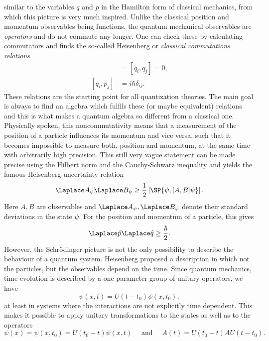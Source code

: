 similar to the variables $q$ and $p$ in the Hamilton form of classical 
mechanics, from which this picture is very much inspired. Unlike the classical 
position and momentum observables being functions, the quantum mechanical 
observables are \emph{operators} and do not commute any longer. One can check 
these by calculating commutators and finds the so-called Heisenberg or 
\emph{classical commutations relations}
\begin{align}
	[p_i, p_j]
	& =
	[q_i, q_j]
	=
	0,
	\\
	[q_i, p_j]
	& =
	i \hbar \delta_{ij}.
\end{align}
These relations are the starting point for all quantization theories. The main 
goal is always to find an algebra which fulfils these (or maybe equivalent) 
relations and this is what makes a quantum algebra so different from a 
classical one. Physically spoken, this noncommutativity means that a 
measurement of the position of a particle influences its momentum and vice 
versa, such that it becomes impossible to measure both, position and momentum, 
at the same time with arbitrarily high precision. This still very vague 
statement can be made precise using the Hilbert norm and the Cauchy-Schwarz 
inequality and yields the famous Heisenberg uncertainty relation
\begin{equation*}
	\Laplace A_\psi
	\Laplace B_\psi
	\geq
	\frac{1}{2}
	\left|
		\SP{\psi, [A, B] \psi}
	\right|.
\end{equation*}
Here $A, B$ are observables and $\Laplace A_\psi, \Laplace B_\psi$ denote their 
standard deviations in the state $\psi$. For the position and momentum of a 
particle, this gives
\begin{equation*}
	\Laplace \hat{p}
	\Laplace \hat{q}
	\geq
	\frac{\hbar}{2}.
\end{equation*}
However, the Schr\"odinger picture is not the only possibility to describe the 
behaviour of a quantum system. Heisenberg proposed a description in which not 
the particles, but the observables depend on the time. Since quantum mechanics,
time evolution is described by a one-parameter group of unitary operators, we have
\begin{equation*}
	\psi(x,t)
	=
	U(t - t_0) \psi(x, t_0),
\end{equation*}
at least in systems where the interactions are not explicitly time dependent. 
This makes it possible to apply unitary transformations to the states 
as well as to the operators 
\begin{equation*}
	\psi(x)
	=
	\psi(x, t_0)
	=
	U(t_0 - t) \psi(x, t)
	\quad \text{ and } \quad
	A(t)
	=
	U(t_0 - t)
	A
	U(t - t_0).
\end{equation*}
